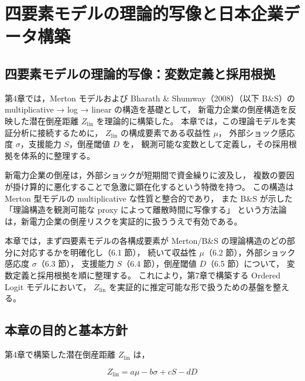 \chapter{四要素モデルの理論的写像と日本企業データ構築}
\label{chap:chapter6}


\section{四要素モデルの理論的写像：変数定義と採用根拠}
\label{chap:variables_theoretical}

第4章では，Merton モデルおよび Bharath \& Shumway（2008）（以下 B\&S）の
multiplicative → log → linear の構造を基礎として，
新電力企業の倒産構造を反映した潜在倒産距離 $Z_{\text{lin}}$ を理論的に構築した。
本章では，この理論モデルを実証分析に接続するために，
$Z_{\text{lin}}$ の構成要素である収益性 $\mu$，
外部ショック感応度 $\sigma$，支援能力 $S$，倒産閾値 $D$ を，
観測可能な変数として定義し，その採用根拠を体系的に整理する。

新電力企業の倒産は，外部ショックが短期間で資金繰りに波及し，
複数の要因が掛け算的に悪化することで急激に顕在化するという特徴を持つ。
この構造は Merton 型モデルの multiplicative な性質と整合的であり，
また B\&S が示した「理論構造を観測可能な proxy によって離散時間に写像する」
という方法論は，新電力企業の倒産リスクを実証的に扱ううえで有効である。

本章では，まず四要素モデルの各構成要素が
Merton/B\&S の理論構造のどの部分に対応するかを明確化し（6.1 節），
続いて収益性 $\mu$（6.2 節），外部ショック感応度 $\sigma$（6.3 節），
支援能力 $S$（6.4 節），倒産閾値 $D$（6.5 節）について，
変数定義と採用根拠を順に整理する。
これにより，第7章で構築する Ordered Logit モデルにおいて，
$Z_{\text{lin}}$ を実証的に推定可能な形で扱うための基盤を整える。

\section{本章の目的と基本方針}

第4章で構築した潜在倒産距離 $Z_{\text{lin}}$ は，



\[
Z_{\text{lin}} = a\mu - b\sigma + cS - dD
\]



